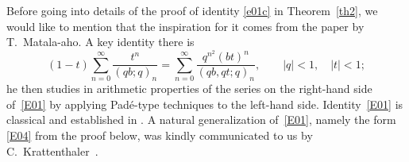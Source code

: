 \documentclass[12pt,reqno]{amsart}
\theoremstyle{remark}
\begin{document}
Before going into details of the proof of identity \eqref{e01c} in Theorem~\ref{th2},
we would like to mention that the inspiration for it comes from the paper \cite{Ma08} by T.~Matala-aho.
A key identity there is
\begin{equation}
(1-t)\sum_{n=0}^\infty\frac{t^n}{(qb;q)_n}
=\sum_{n=0}^\infty\frac{q^{n^2}(bt)^n}{(qb,qt;q)_n},
\qquad |q|<1, \quad |t|<1;
\label{E01}
\end{equation}
he then studies in \cite{Ma08} arithmetic properties of the series
on the right-hand side of~\eqref{E01} by applying Pad\'e-type
techniques to the left-hand side. Identity~\eqref{E01} is classical and established in \cite[Eq.~(12.3)]{Fi88}.
A natural generalization of~\eqref{E01}, namely the form \eqref{E04} from the proof below,
was kindly communicated to us by C.~Krattenthaler~\cite{Kr06}.
\end{document}
